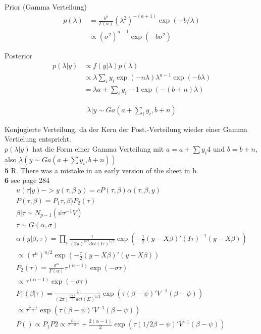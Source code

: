 \documentclass{article}
\begin{document}
Prior (Gamma Verteilung)
\begin{align*}
p(\lambda)  &= \frac{b^a}{\Gamma(a)} (\lambda^2)^{-(a+1)} \exp(-b/\lambda)  \\
&\propto  (\sigma^2)^{a-1} \exp(-b\sigma^2)  
\end{align*}

Posterior
\begin{align*}
p(\lambda | y) &\propto f(y|\lambda) p(\lambda)  \\
&\propto \lambda{\sum_i y_i} \exp(-n \lambda) \lambda^{a-1} \exp(-b \lambda) \\
&= \lambda{ a + \sum_i y_i -1 } \exp(-(b+n)\lambda)
\end{align*}

\begin{align*}
\lambda | y \sim Ga(a + \sum_i y_i, b+n)
\end{align*}

Konjugierte Verteilung, da der Kern der Post.-Verteilung wieder einer Gamma Vertielung entspricht.\\
$p(\lambda | y)$ hat die Form einer Gamma Verteilung mit $a=a+\sum y_i4$ und $b=b+n$, also $\lambda(y  \sim Ga(a+\sum y_i, b+n) )$\\

\textbf{5} R. There was a mistake in an early version of the sheet in b.\\
\newpage
\textbf{6} see page 284\\

\begin{align*}
u(\tau | y) -> y(\tau, \beta |y) = cP(\tau, \beta) \alpha(\tau, \beta, y)\\
P(\tau, \beta) = P_1 \tau, \beta) P_2(\tau) \\
\beta|\tau \sim N_{p-1}(\psi \tau^{-1} V) \\
\tau \sim G(\alpha, \sigma)  \\
\alpha(y|\beta, \tau) = \prod_i \frac{1}{(2 \pi)^{p/2} det(I \tau)^{1/2}} 
\exp(-\frac{1}{2}(y-X\beta)' (I \tau)^{-1} (y-X\beta))  \\
\propto (\tau^n)^{n/2} \exp(-\frac{\tau}{2}(y-X\beta)'  (y-X\beta))  \\
P_2(\tau) = \frac{\sigma^\alpha}{\Gamma(\alpha)} \tau^{(\alpha-1)} \exp(-\sigma \tau) \\ 
\propto  \tau^{(\alpha-1)} \exp(-\sigma \tau) \\ 
P_1(\beta|\tau) = \frac{1}{(2 \pi)^{\frac{k+1}{2}} det(\Sigma)^{1/2}} 
\exp(\tau (\beta-\psi)' V^{-1} (\beta-\psi))  \\
\propto \tau^{\frac{k+1}{2}} 
\exp(\tau (\beta-\psi)' V^{-1} (\beta-\psi))  \\
P() \propto P_1 P2 \propto \tau^{\frac{k+1}{2}} + \frac{2(\alpha-1)}{2} \exp(\tau (1/2\beta-\psi)' V^{-1} (\beta-\psi)) 
\end{align*}
\end{document}
